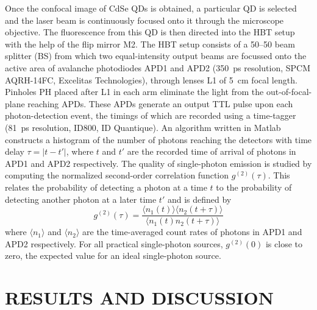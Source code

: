\documentclass[%
 aip,
 amsmath,amssymb,
 reprint,%
]{revtex4-1}
\begin{document}
Once the confocal image of CdSe QDs is obtained, a particular QD is selected and the laser beam is continuously focused onto it through the microscope objective. The fluorescence from this QD is then directed into the HBT setup with the help of the flip mirror M2. The HBT setup consists of a 50--50 beam splitter (BS) from which  two equal-intensity output beams are focussed onto the active area of avalanche photodiodes APD1 and APD2 (350~ps resolution, SPCM AQRH-14FC, Excelitas Technologies), through lenses L1 of 5~cm focal length.  Pinholes PH placed after L1 in each arm eliminate the light from the out-of-focal-plane reaching APDs. These APDs generate an output TTL pulse upon each photon-detection event,  the timings of which  are recorded using a time-tagger (81~ps resolution, ID800, ID Quantique). An algorithm written in Matlab constructs a histogram of the number of photons reaching the detectors with time delay $\tau = |t - t'|$, where $t$ and $t'$ are the recorded time of arrival of photons in APD1 and APD2 respectively. The quality of single-photon emission is studied by computing the normalized second-order correlation function $g^{(2)}(\tau)$. This relates the probability of detecting a photon at a time $t$ to the probability of detecting another photon at a later time $t'$ and is defined by
\begin{equation}
g^{(2)}(\tau) = \frac{\langle n_1(t) \rangle \langle n_2(t+\tau) \rangle}{\langle n_1(t) n_2(t+\tau) \rangle}
\end{equation}
\noindent where $\langle n_1 \rangle $ and $\langle n_2 \rangle$ are the  time-averaged count rates of photons in APD1 and APD2 respectively. For all practical single-photon sources, $g^{(2)}(0)$ is close to zero, the expected value for  an ideal single-photon source. 


\section{\textbf{RESULTS AND DISCUSSION}}
\end{document}
